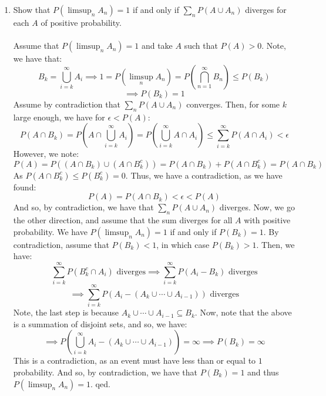 \documentclass[12pt,a4paper]{article}
\newcommand{\1}[1]{\mathbbm{1}\left\{ #1 \right\}}
\begin{document}
\begin{enumerate}
	\item Show that $P(\limsup_n A_n) = 1$ if and only if $\sum_n P(A \cup A_n)$ diverges for each $A$ of positive probability.
	\\\\
	Assume that $P(\limsup_n A_n) = 1$ and take $A$ such that $P(A) > 0$. Note, we have that:
	$$
		B_k = \bigcup_{i = k}^\infty A_i \implies 1 = P(\limsup_n A_n) =
		P\left(\bigcap_{n=1}^\infty B_n\right) \leq
		P(B_k)
	$$
	$$
		\implies P(B_k) = 1
	$$
	Assume by contradiction that $\sum_n P(A \cup A_n)$ converges. Then, for some $k$ large enough, we have for $\epsilon < P(A)$:
	$$
		P(A \cap B_k) = P\left(A \cap \bigcup_{i = k}^\infty A_i\right) =
		P\left(\bigcup_{i = k}^\infty A \cap A_i\right) \leq
		\sum_{i = k}^\infty P(A \cap A_i) < \epsilon 
	$$
	However, we note:
	$$
		P(A) = P((A \cap B_k) \cup (A \cap B_k^c)) = P(A \cap B_k) + P(A \cap B_k^c) = P(A \cap B_k)
	$$
	As $P(A \cap B_k^c) \leq P(B_k^c) = 0$. Thus, we have a contradiction, as we have found:
	$$
		P(A) = P(A \cap B_k) < \epsilon < P(A)
	$$
	And so, by contradiction, we have that $\sum_n P(A \cup A_n)$ diverges. Now, we go the other direction, and assume that the sum diverges for all $A$ with positive probability. We have $P(\limsup_n A_n) = 1$ if and only if $P(B_k) = 1$. By contradiction, assume that $P(B_k) < 1$, in which case $P(B_k) > 1$. Then, we have:
	$$
		\sum_{i=k}^\infty P(B_k^c \cap A_i) \text{ diverges} \implies
		\sum_{i=k}^\infty P(A_i - B_k) \text{ diverges}
	$$
	$$
		\implies
		\sum_{i=k}^\infty P(A_i - (A_k \cup \cdots \cup A_{i-1})) \text{ diverges}
	$$
	Note, the last step is because $A_k \cup \cdots \cup A_{i-1} \subseteq B_k$. Now, note that the above is a summation of disjoint sets, and so, we have:
	$$
		\implies
		P\left(\bigcup_{i=k}^\infty A_i - (A_k \cup \cdots \cup A_{i-1})\right) = \infty
		\implies
		P(B_k) = \infty
	$$
	This is a contradiction, as an event must have less than or equal to $1$ probability. And so, by contradiction, we have that $P(B_k) = 1$ and thus $P(\limsup_n A_n) = 1$. qed.
	

\end{enumerate}
\end{document}
